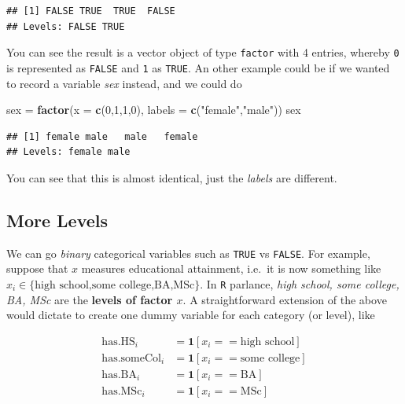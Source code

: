 \documentclass[]{book}
\newenvironment{Shaded}{\begin{snugshade}}{\end{snugshade}}
\newcommand{\KeywordTok}[1]{\textcolor[rgb]{0.13,0.29,0.53}{\textbf{#1}}}
\newcommand{\DataTypeTok}[1]{\textcolor[rgb]{0.13,0.29,0.53}{#1}}
\newcommand{\DecValTok}[1]{\textcolor[rgb]{0.00,0.00,0.81}{#1}}
\newcommand{\StringTok}[1]{\textcolor[rgb]{0.31,0.60,0.02}{#1}}
\newcommand{\NormalTok}[1]{#1}
\theoremstyle{definition}
\theoremstyle{definition}
\theoremstyle{definition}
\theoremstyle{remark}
\begin{document}
\begin{verbatim}
## [1] FALSE TRUE  TRUE  FALSE
## Levels: FALSE TRUE
\end{verbatim}

You can see the result is a vector object of type \texttt{factor} with 4
entries, whereby \texttt{0} is represented as \texttt{FALSE} and
\texttt{1} as \texttt{TRUE}. An other example could be if we wanted to
record a variable \emph{sex} instead, and we could do

\begin{Shaded}
\begin{Highlighting}[]
\NormalTok{sex =}\StringTok{ }\KeywordTok{factor}\NormalTok{(}\DataTypeTok{x =} \KeywordTok{c}\NormalTok{(}\DecValTok{0}\NormalTok{,}\DecValTok{1}\NormalTok{,}\DecValTok{1}\NormalTok{,}\DecValTok{0}\NormalTok{), }\DataTypeTok{labels =} \KeywordTok{c}\NormalTok{(}\StringTok{"female"}\NormalTok{,}\StringTok{"male"}\NormalTok{))}
\NormalTok{sex}
\end{Highlighting}
\end{Shaded}

\begin{verbatim}
## [1] female male   male   female
## Levels: female male
\end{verbatim}

You can see that this is almost identical, just the \emph{labels} are
different.

\subsection{More Levels}\label{more-levels}

We can go \emph{binary} categorical variables such as \texttt{TRUE} vs
\texttt{FALSE}. For example, suppose that \(x\) measures educational
attainment, i.e.~it is now something like
\(x_i \in \{\text{high school,some college,BA,MSc}\}\). In \texttt{R}
parlance, \emph{high school, some college, BA, MSc} are the
\textbf{levels of factor \(x\)}. A straightforward extension of the
above would dictate to create one dummy variable for each category (or
level), like

\begin{align*}
\text{has.HS}_i &= \mathbf{1}[x_i==\text{high school}] \\
\text{has.someCol}_i &= \mathbf{1}[x_i==\text{some college}] \\
\text{has.BA}_i &= \mathbf{1}[x_i==\text{BA}] \\
\text{has.MSc}_i &= \mathbf{1}[x_i==\text{MSc}] 
\end{align*}
\end{document}
